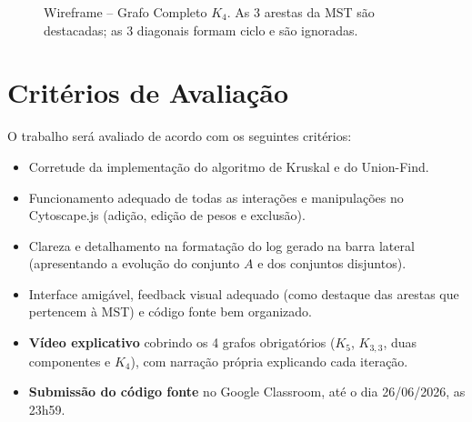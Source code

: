 \documentclass[12pt,a4paper]{article}
\begin{document}
\begin{figure}[H]
\caption{Wireframe -- Grafo Completo $K_4$. As 3 arestas da MST são destacadas; as 3 diagonais formam ciclo e são ignoradas.}
\label{fig:wire-k4}
\end{figure}

\section*{Critérios de Avaliação}

O trabalho será avaliado de acordo com os seguintes critérios:
\begin{itemize}
    \item Corretude da implementação do algoritmo de Kruskal e do Union-Find.
    \item Funcionamento adequado de todas as interações e manipulações no Cytoscape.js (adição, edição de pesos e exclusão).
    \item Clareza e detalhamento na formatação do log gerado na barra lateral (apresentando a evolução do conjunto $A$ e dos conjuntos disjuntos).
    \item Interface amigável, feedback visual adequado (como destaque das arestas que pertencem à MST) e código fonte bem organizado.
    \item \textbf{Vídeo explicativo} cobrindo os 4 grafos obrigatórios ($K_5$, $K_{3,3}$, duas componentes e $K_4$), com narração própria explicando cada iteração.
    \item \textbf{Submissão do código fonte} no Google Classroom, até o dia 26/06/2026, as 23h59.
\end{itemize}
\end{document}

